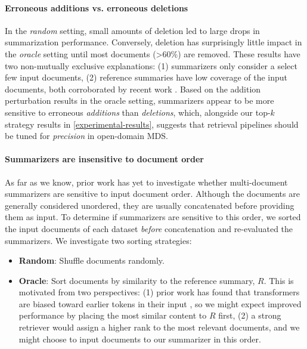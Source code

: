 \documentclass[11pt]{article}
\begin{document}
\paragraph{Erroneous additions vs. erroneous deletions}
In the \textit{random} setting, small amounts of deletion led to large drops in summarization performance. Conversely, deletion has surprisingly little impact in the \textit{oracle} setting until most documents (>60\%) are removed.
These results have two non-mutually exclusive explanations: (1) summarizers only consider a select few input documents, (2) reference summaries have low coverage of the input documents, both corroborated by recent work \citep{https://doi.org/10.48550/arxiv.2210.12688}. Based on the addition perturbation results in the oracle setting, summarizers appear to be more sensitive to erroneous \textit{additions} than \textit{deletions}, which, alongside our top-\(k\) strategy results in \textsection \ref{experimental-results}, suggests that retrieval pipelines should be tuned for \textit{precision} in open-domain MDS.
\vspace{-5.0mm}

\paragraph{Summarizers are insensitive to document order} \label{sorting} As far as we know, prior work has yet to investigate whether multi-document summarizers are sensitive to input document order. Although the documents are generally considered unordered, they are usually concatenated before providing them as input. To determine if summarizers are sensitive to this order, we sorted the input documents of each dataset \textit{before} concatenation and re-evaluated the summarizers. We investigate two sorting strategies:

\begin{itemize}[itemsep=0.2pt, topsep=3pt, leftmargin=10pt]
    \item \textbf{Random}: Shuffle documents randomly.
    \item \textbf{Oracle}: Sort documents by similarity to the reference summary, \(R\). This is motivated from two perspectives: (1) prior work has found that transformers are biased toward earlier tokens in their input \citep{Hofsttter2021MitigatingTP}, so we might expect improved performance by placing the most similar content to \(R\) first, (2) a strong retriever would assign a higher rank to the most relevant documents, and we might choose to input documents to our summarizer in this order. 
\end{itemize}
\end{document}
